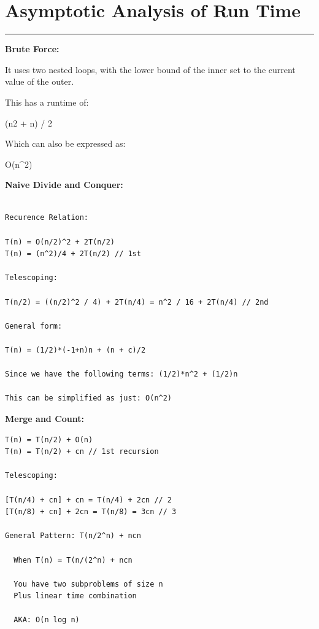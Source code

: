 \documentclass[letterpaper,10pt,titlepage,fleqn]{article}
\begin{document}
\section*{Asymptotic Analysis of Run Time}
\hrule
\begin{centering}
\textbf{Brute Force:}
\end{centering}
It uses two nested loops, with the lower bound of the inner set to the current value of the outer. 

This has a runtime of: 

(n2 + n) / 2 

Which can also be expressed as:

O(n^2)

\begin{centering}
\textbf{Naive Divide and Conquer:}
\end{centering}

\begin{lstlisting}

Recurence Relation:

T(n) = O(n/2)^2 + 2T(n/2)
T(n) = (n^2)/4 + 2T(n/2) // 1st

Telescoping: 

T(n/2) = ((n/2)^2 / 4) + 2T(n/4) = n^2 / 16 + 2T(n/4) // 2nd

General form:

T(n) = (1/2)*(-1+n)n + (n + c)/2

Since we have the following terms: (1/2)*n^2 + (1/2)n

This can be simplified as just: O(n^2)

\end{lstlisting}

\begin{centering}
\textbf{Merge and Count:}
\end{centering}

\begin{lstlisting}
T(n) = T(n/2) + O(n) 
T(n) = T(n/2) + cn // 1st recursion 

Telescoping:

[T(n/4) + cn] + cn = T(n/4) + 2cn // 2 
[T(n/8) + cn] + 2cn = T(n/8) = 3cn // 3 

General Pattern: T(n/2^n) + ncn

  When T(n) = T(n/(2^n) + ncn

  You have two subproblems of size n
  Plus linear time combination

  AKA: O(n log n)
\end{lstlisting}
\end{document}
